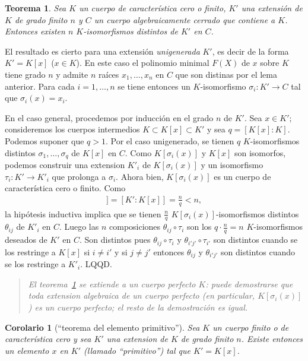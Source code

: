 \documentclass[bibtotoc,leqno,spanish]{amsbook}
\newcommand{\QED}{LQQD.}
\renewcommand{\to}[1][]{\xrightarrow{#1}}
\numberwithin{equation}{section}
\newenvironment{comm}%
	{\begin{quotation}\itshape\Small}
	{\end{quotation}}
\theoremstyle{note}
\theoremstyle{note}
\newtheorem{theorem}{Teorema}
\newtheorem*{corollary*}{Corolario}
\theoremstyle{rem}
\numberwithin{theorem}{section}
\numberwithin{proposition}{section}
\numberwithin{definition}{section}
\numberwithin{lemma}{section}
\numberwithin{corollary}{section}
\numberwithin{example}{section}
\numberwithin{footnote}{section}%
\begin{document}
\begin{theorem}\label{teo2.4.1}
Sea $K$ un cuerpo de caracter\'istica cero o finito, $K'$ una extensi\'on de $K$ de grado finito $n$
y $C$ un cuerpo algebraicamente cerrado que contiene a $K$. Entonces existen $n$ $K$-isomorfismos distintos
de $K'$ en $C$.
\end{theorem}

El resultado es cierto para una extensi\'on {\em unigenerada} $K'$, es decir de la forma $K' = K[x]$
($x\in K$). En este caso el polinomio minimal $F(X)$ de $x$ sobre $K$ tiene grado $n$ y admite
$n$ ra\'ices $x_{1},\dots, x_{n}$ en $C$ que son distinas por el lema anterior. Para cada $i=1,\dots,n$ se
tiene entonces un $K$-isomorfismo $\sigma_{i}:K'\to C$ tal que $\sigma_{i}(x) = x_{i}$.

En el caso general, procedemos por inducci\'on en el grado $n$ de $K'$. Sea $x\in K'$; consideremos los cuerpos
intermedios $K\subset K[x]\subset K'$ y sea $q = [K[x]:K]$. Podemos suponer que $q > 1$. Por el caso unigenerado,
se tienen $q$ $K$-isomorfismos distintos $\sigma_{1},\dots,\sigma_{q}$ de $K[x]$ en $C$. Como
$K[\sigma_{i}(x)]$ y $K[x]$ son isomorfos, podemos construir una extension $K'_{i}$ de $K[\sigma_{i}(x)]$
y un isomorfismo $\tau_{i}:K'\to K'_{i}$ que prolonga a $\sigma_{i}$. Ahora bien, $K[\sigma_{i}(x)]$
es un cuerpo de caracter\'istica cero o finito. Como
\begin{gather*}
[K'_{i}:K[\sigma_{i}(x)]] = [K':K[x]] = \frac{n}{q} < n,
\end{gather*}
la hip\'otesis inductiva implica que se tienen $\frac{n}{q}$ $K[\sigma_{i}(x)]$-isomorfismos distintos
$\theta_{ij}$ de $K'_{i}$ en $C$. Luego las $n$ composiciones $\theta_{ij}\circ\tau_{i}$ son los
$q\cdot\frac{n}{q} = n$ $K$-isomorfismos deseados de $K'$ en $C$. Son distintos pues
$\theta_{ij}\circ\tau_{i}$ y $\theta_{i'j'}\circ\tau_{i'}$ son distintos cuando se los restringe a
$K[x]$ si $i\neq i'$ y si $j\neq j'$ entonces $\theta_{ij}$ y $\theta_{i'j'}$ son distintos cuando
se los restringe a $K'_{i}$. \QED

\begin{comm}
El teorema~\ref{teo2.4.1} se extiende a un cuerpo perfecto $K$: puede demostrarse que
toda extension algebraica de
un cuerpo perfecto (en particular, $K[\sigma_{i}(x)]$) es un cuerpo perfecto; el resto de
la demostraci\'on es igual.
\end{comm}

\begin{corollary*}[``teorema del elemento primitivo'']
Sea $K$ un cuerpo finito o de caracter\'istica cero y sea $K'$ una extension de $K$ de grado finito $n$.
Existe entonces un elemento $x$ en $K'$ (llamado ``primitivo'') tal que $K' = K[x]$.
\end{corollary*}
\end{document}
